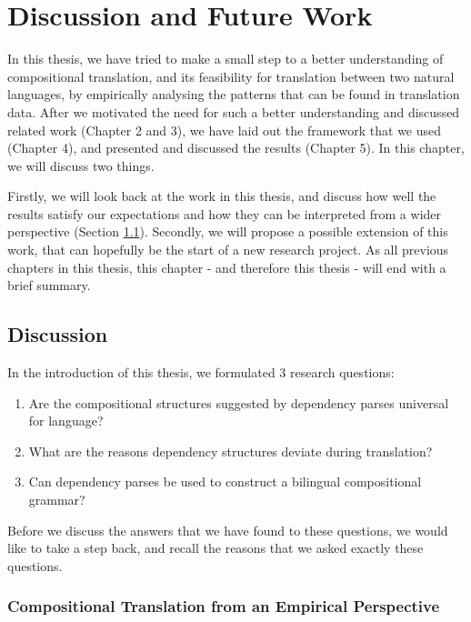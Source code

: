 %
\newcommand{\G}{\mathcal{G}}
\newcommand{\Hg}{\mathcal{H}}
\newcommand{\N}{\mathcal{N}}
\newcommand{\C}{\mathcal{C}}
\newcommand{\Pp}{\mathcal{P}}

%
\chapter{Discussion and Future Work}

In this thesis, we have tried to make a small step to a better understanding of compositional translation, and its feasibility for translation between two natural languages, by empirically analysing the patterns that can be found in translation data. After we motivated the need for such a better understanding and discussed related work (Chapter 2 and 3), we have laid out the framework that we used (Chapter 4), and presented and discussed the results (Chapter 5). In this chapter, we will discuss two things.

Firstly, we will look back at the work in this thesis, and discuss how well the results satisfy our expectations and how they can be interpreted from a wider perspective (Section \ref{sec:discussion}). Secondly, we will propose a possible extension of this work, that can hopefully be the start of a new research project. As all previous chapters in this thesis, this chapter - and therefore this thesis - will end with a brief summary.

\section{Discussion}
\label{sec:discussion}

In the introduction of this thesis, we formulated 3 research questions:\begin{enumerate}
\item Are the compositional structures suggested by dependency parses universal for language?
\item What are the reasons dependency structures deviate during translation?
\item Can dependency parses be used to construct a bilingual compositional grammar?
\end{enumerate}

Before we discuss the answers that we have found to these questions, we would like to take a step back, and recall the reasons that we asked exactly these questions.

\subsection{Compositional Translation from an Empirical Perspective}

